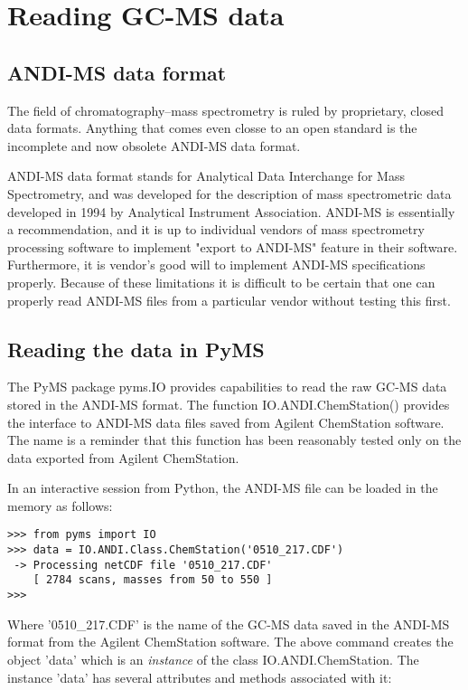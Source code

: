 \section{Reading GC-MS data}

\subsection{ANDI-MS data format}

The field of chromatography--mass spectrometry is ruled by proprietary, closed
data formats.  Anything that comes even closse to an open standard is the
incomplete and now obsolete ANDI-MS data format.

ANDI-MS data format stands for Analytical Data Interchange for Mass
Spectrometry, and was developed for the description of mass spectrometric
data developed in 1994 by Analytical Instrument Association. ANDI-MS 
is essentially a recommendation, and it is up to individual vendors of
mass spectrometry processing software to implement "export to ANDI-MS"
feature in their software. Furthermore, it is vendor's good will to
implement ANDI-MS specifications properly. Because of these limitations
it is difficult to be certain that one can properly read ANDI-MS files
from a particular vendor without testing this first.

\subsection{Reading the data in PyMS}

The PyMS package pyms.IO provides capabilities to read the raw GC-MS
data stored in the ANDI-MS format. The function IO.ANDI.ChemStation()
provides the interface to ANDI-MS data files saved from Agilent
ChemStation software. The name is a reminder that this function has
been reasonably tested only on the data exported from Agilent ChemStation.

In an interactive session from Python, the ANDI-MS file can be loaded
in the memory as follows:

\begin{verbatim}
>>> from pyms import IO
>>> data = IO.ANDI.Class.ChemStation('0510_217.CDF')
 -> Processing netCDF file '0510_217.CDF'
    [ 2784 scans, masses from 50 to 550 ]
>>>
\end{verbatim}

Where '0510\_217.CDF' is the name of the GC-MS data saved in the ANDI-MS
format from the Agilent ChemStation software.  The above command creates
the object 'data' which is an {\em instance} of the class IO.ANDI.ChemStation.
The instance 'data' has several attributes and methods associated with it:

